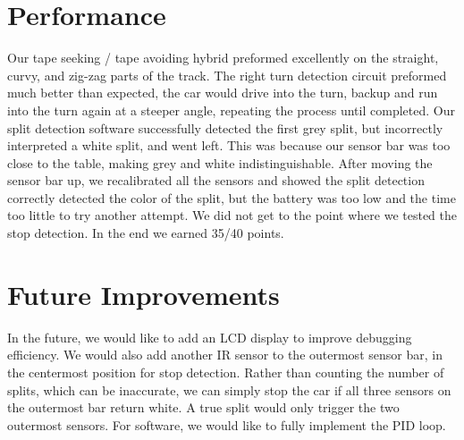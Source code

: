 \documentclass{article}
\begin{document}
\part{Performance}
Our tape seeking / tape avoiding hybrid preformed excellently on the straight, curvy, and zig-zag parts of the track. The right turn detection circuit preformed much better than expected, the car would drive into the turn, backup and run into the turn again at a steeper angle, repeating the process until completed. Our split detection software successfully detected the first grey split, but incorrectly interpreted a white split, and went left. This was because our sensor bar was too close to the table, making grey and white indistinguishable. After moving the sensor bar up, we recalibrated all the sensors and showed the split detection correctly detected the color of the split, but the battery was too low and the time too little to try another attempt. We did not get to the point where we tested the stop detection. In the end we earned 35/40 points.

\part{Future Improvements}
In the future, we would like to add an LCD display to improve debugging efficiency. We would also add another IR sensor to the outermost sensor bar, in the centermost position for stop detection. Rather than counting the number of splits, which can be inaccurate, we can simply stop the car if all three sensors on the outermost bar return white. A true split would only trigger the two outermost sensors. For software, we would like to fully implement the PID loop.
\end{document}
